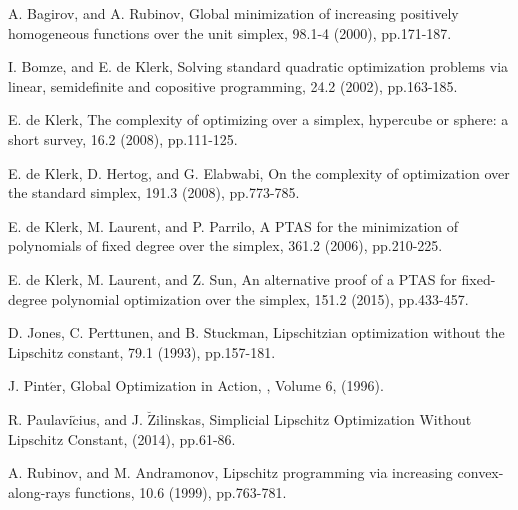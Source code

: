 \documentclass[a4paper,11pt]{jreport}
\begin{document}
\newpage

\renewcommand{\bibname}{参考文献}

\begin{thebibliography}{1}

A. Bagirov, and A. Rubinov,
\newblock Global minimization of increasing positively homogeneous functions over the unit simplex,
 98.1-4 (2000), pp.171-187.

I. Bomze, and E. de Klerk,
\newblock Solving standard quadratic optimization problems via linear, semidefinite and copositive programming,
 24.2 (2002), pp.163-185.

E. de Klerk,
\newblock The complexity of optimizing over a simplex, hypercube or sphere: a short survey,
 16.2 (2008), pp.111-125.

E. de Klerk, D. Hertog, and G. Elabwabi,
\newblock On the complexity of optimization over the standard simplex,
 191.3 (2008), pp.773-785.

E. de Klerk, M. Laurent, and P. Parrilo,
\newblock A PTAS for the minimization of polynomials of fixed degree over the simplex,
 361.2 (2006), pp.210-225.

E. de Klerk, M. Laurent, and Z. Sun,
\newblock An alternative proof of a PTAS for fixed-degree polynomial optimization over the simplex,
 151.2 (2015), pp.433-457.

D. Jones, C. Perttunen, and B. Stuckman,
\newblock Lipschitzian optimization without the Lipschitz constant,
 79.1 (1993), pp.157-181.

J. Pint$\acute{\mbox{e}}$r,
\newblock Global Optimization in Action,
, Volume 6, (1996).

R. Paulavi$\breve{\mbox{c}}$ius, and J. $\breve{\mbox{Z}}$ilinskas,
\newblock Simplicial Lipschitz Optimization Without Lipschitz Constant,
 (2014), pp.61-86.

A. Rubinov, and M. Andramonov,
\newblock Lipschitz programming via increasing convex-along-rays functions,
 10.6 (1999), pp.763-781.


\end{thebibliography}
\end{document}
